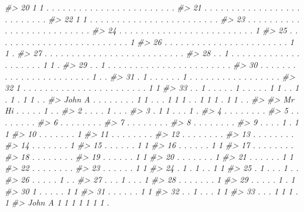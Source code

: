 \documentclass[
]{book}
\newenvironment{Shaded}{\begin{snugshade}}{\end{snugshade}}
\newcommand{\CommentTok}[1]{\textcolor[rgb]{0.56,0.35,0.01}{\textit{#1}}}
\begin{document}
\begin{Shaded}
\begin{Highlighting}[]
\CommentTok{\#\textgreater{} 20     1 1 . . . . . . . . . . . . . . . . . . . . . . . .}
\CommentTok{\#\textgreater{} 21     . . . . . . . . . . . . . . . . . . . . . . . . . .}
\CommentTok{\#\textgreater{} 22     1 1 . . . . . . . . . . . . . . . . . . . . . . . .}
\CommentTok{\#\textgreater{} 23     . . . . . . . . . . . . . . . . . . . . . . . . . .}
\CommentTok{\#\textgreater{} 24     . . . . . . . . . . . . . . . . . . . . . . . . . 1}
\CommentTok{\#\textgreater{} 25     . . . . . . . . . . . . . . . . . . . . . . . . . 1}
\CommentTok{\#\textgreater{} 26     . . . . . . . . . . . . . . . . . . . . . . . 1 1 .}
\CommentTok{\#\textgreater{} 27     . . . . . . . . . . . . . . . . . . . . . . . . . .}
\CommentTok{\#\textgreater{} 28     . . 1 . . . . . . . . . . . . . . . . . . . . 1 1 .}
\CommentTok{\#\textgreater{} 29     . . 1 . . . . . . . . . . . . . . . . . . . . . . .}
\CommentTok{\#\textgreater{} 30     . . . . . . . . . . . . . . . . . . . . . . . 1 . .}
\CommentTok{\#\textgreater{} 31     . 1 . . . . . . 1 . . . . . . . . . . . . . . . . .}
\CommentTok{\#\textgreater{} 32     1 . . . . . . . . . . . . . . . . . . . . . . . 1 1}
\CommentTok{\#\textgreater{} 33     . . 1 . . . . . 1 . . . . . 1 1 . . 1 . 1 . 1 1 . .}
\CommentTok{\#\textgreater{} John A . . . . . . . . 1 1 . . . 1 1 1 . . 1 1 1 . 1 1 . .}
\CommentTok{\#\textgreater{}                       }
\CommentTok{\#\textgreater{} Mr Hi  . . . . . 1 . .}
\CommentTok{\#\textgreater{} 2      . . . . 1 . . .}
\CommentTok{\#\textgreater{} 3      . 1 1 . . . 1 .}
\CommentTok{\#\textgreater{} 4      . . . . . . . .}
\CommentTok{\#\textgreater{} 5      . . . . . . . .}
\CommentTok{\#\textgreater{} 6      . . . . . . . .}
\CommentTok{\#\textgreater{} 7      . . . . . . . .}
\CommentTok{\#\textgreater{} 8      . . . . . . . .}
\CommentTok{\#\textgreater{} 9      . . . . 1 . 1 1}
\CommentTok{\#\textgreater{} 10     . . . . . . . 1}
\CommentTok{\#\textgreater{} 11     . . . . . . . .}
\CommentTok{\#\textgreater{} 12     . . . . . . . .}
\CommentTok{\#\textgreater{} 13     . . . . . . . .}
\CommentTok{\#\textgreater{} 14     . . . . . . . 1}
\CommentTok{\#\textgreater{} 15     . . . . . . 1 1}
\CommentTok{\#\textgreater{} 16     . . . . . . 1 1}
\CommentTok{\#\textgreater{} 17     . . . . . . . .}
\CommentTok{\#\textgreater{} 18     . . . . . . . .}
\CommentTok{\#\textgreater{} 19     . . . . . . 1 1}
\CommentTok{\#\textgreater{} 20     . . . . . . . 1}
\CommentTok{\#\textgreater{} 21     . . . . . . 1 1}
\CommentTok{\#\textgreater{} 22     . . . . . . . .}
\CommentTok{\#\textgreater{} 23     . . . . . . 1 1}
\CommentTok{\#\textgreater{} 24     . 1 . 1 . . 1 1}
\CommentTok{\#\textgreater{} 25     . 1 . . . 1 . .}
\CommentTok{\#\textgreater{} 26     . . . . . 1 . .}
\CommentTok{\#\textgreater{} 27     . . . 1 . . . 1}
\CommentTok{\#\textgreater{} 28     . . . . . . . 1}
\CommentTok{\#\textgreater{} 29     . . . . . 1 . 1}
\CommentTok{\#\textgreater{} 30     1 . . . . . 1 1}
\CommentTok{\#\textgreater{} 31     . . . . . . 1 1}
\CommentTok{\#\textgreater{} 32     . . 1 . . . 1 1}
\CommentTok{\#\textgreater{} 33     . . . 1 1 1 . 1}
\CommentTok{\#\textgreater{} John A 1 1 1 1 1 1 1 .}


\end{Highlighting}
\end{Shaded}
\end{document}
